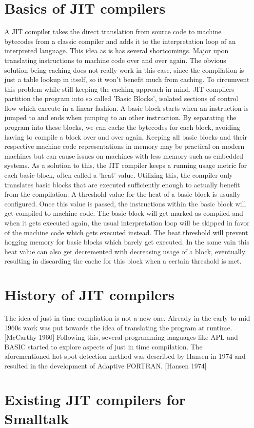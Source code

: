 \section{Basics of JIT compilers}
A JIT compiler takes the direct translation from source code to machine bytecodes from a classic compiler and adds it to the interpretation loop of an interpreted language.
This idea as is has several shortcomings. Major upon translating instructions to machine code over and over again. The obvious solution being caching does not really work in this case, since the compilation is just a table lookup in itself, so it won't benefit much from caching.
To circumvent this problem while still keeping the caching approach in mind, JIT compilers partition the program into so called 'Basic Blocks', isolated sections of control flow which execute in a linear fashion. 
A basic block starts when an instruction is jumped to and ends when jumping to an other instruction. 
By separating the program into these blocks, we can cache the bytecodes for each block, avoiding having to compile a block over and over again. 
Keeping all basic blocks and their respective machine code representations in memory may be practical on modern machines but can cause issues on machines with less memory such as embedded systems.
As a solution to this, the JIT compiler keeps a running usage metric for each basic block, often called a 'heat' value. 
Utilizing this, the compiler only translates basic blocks that are executed sufficiently enough to actually benefit from the compilation. 
A threshold value for the heat of a basic block is usually configured. 
Once this value is passed, the instructions within the basic block will get compiled to machine code.
The basic block will get marked as compiled and when it gets executed again, the usual interpretation loop will be skipped in favor of the machine code which gets executed instead. 
The heat threshold will prevent hogging memory for basic blocks which barely get executed. In the same vain this heat value can also get decremented with decreasing usage of a block, eventually resulting in discarding the cache for this block when a certain threshold is met. 

\section{History of JIT compilers}
The idea of just in time compliation is not a new one. 
Already in the early to mid 1960s work was put towards the idea of translating the program at runtime. [McCarthy 1960] 
Following this, several programming languages like APL and BASIC started to explore aspects of just in time compilation.
The aforementioned hot spot detection method was described by Hansen in 1974 and resulted in the development of Adaptive FORTRAN. [Hansen 1974]



\section{Existing JIT compilers for Smalltalk}

